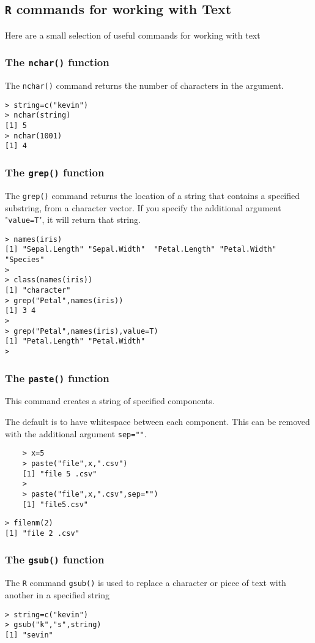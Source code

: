 \documentclass[12pt]{article}
\begin{document}
\subsection*{\texttt{R} commands for working with Text}

Here are a small selection of useful commands for working with text

\subsubsection*{The \texttt{nchar()} function}
The \texttt{nchar()} command returns the number of characters in the argument.
\begin{verbatim}
> string=c("kevin")
> nchar(string)
[1] 5
> nchar(1001)
[1] 4
\end{verbatim}

\subsubsection*{The \texttt{grep()} function}
The \texttt{grep()} command returns the location of a string that contains a specified substring, from a character vector.
If you specify the additional argument "\texttt{value=T}", it will return that string.
\begin{verbatim}
> names(iris)
[1] "Sepal.Length" "Sepal.Width"  "Petal.Length" "Petal.Width"  "Species"     
> 
> class(names(iris))
[1] "character"
> grep("Petal",names(iris))
[1] 3 4
> 
> grep("Petal",names(iris),value=T)
[1] "Petal.Length" "Petal.Width" 
> 
\end{verbatim}
\newpage
\subsubsection*{The \texttt{paste()} function}
This command creates a string of specified components. 

\noindent The default is to have whitespace between each component. This can be removed with the additional argument \texttt{sep=""}.
\begin{framed}
	\begin{verbatim}
	> x=5
	> paste("file",x,".csv")
	[1] "file 5 .csv"
	>
	> paste("file",x,".csv",sep="")
	[1] "file5.csv"
	\end{verbatim}
\end{framed}
\begin{verbatim}
> filenm(2)
[1] "file 2 .csv"
\end{verbatim}
\subsubsection*{The \texttt{gsub()} function}
The \texttt{R} command \texttt{gsub()} is used to replace a character or piece of text with another in a specified string
\begin{verbatim}
> string=c("kevin")
> gsub("k","s",string)
[1] "sevin"
\end{verbatim}
\newpage
\end{document}
